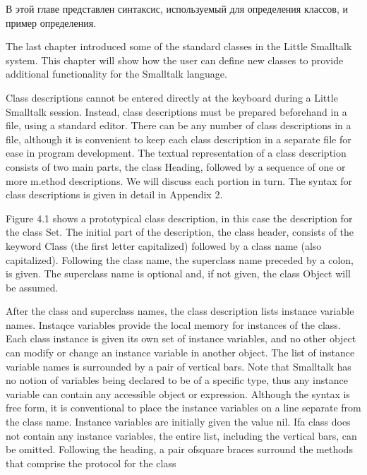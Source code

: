 \secdown

В этой главе представлен синтаксис, используемый для определения классов, и пример определения.

\bigskip

The last chapter introduced some of the standard classes in the Little
Smalltalk system. This chapter will show how the user can define new
classes to provide additional functionality for the Smalltalk language.

Class descriptions cannot be entered directly at the keyboard during
a Little Smalltalk session. Instead, class descriptions must be prepared
beforehand in a file, using a standard editor. There can be any number of
class descriptions in a file, although it is convenient to keep each class
description in a separate file for ease in program development. The textual
representation of a class description consists of two main parts, the class
Heading, followed by a sequence of one or more m.ethod descriptions. We
will discuss each portion in turn. The syntax for class descriptions is given
in detail in Appendix 2.

Figure 4.1 shows a prototypical class description, in this case the description for the class Set. The initial part of the description, the class
header, consists of the keyword Class (the first letter capitalized) followed
by a class name (also capitalized). Following the class name, the superclass
name preceded by a colon, is given. The superclass name is optional and,
if not given, the class Object will be assumed.

After the class and superclass names, the class description lists instance
variable names. Instaqce variables provide the local memory for instances
of the class. Each class instance is given its own set of instance variables,
and no other object can modify or change an instance variable in another
object. The list of instance variable names is surrounded by a pair of
vertical bars. Note that Smalltalk has no notion of variables being declared
to be of a specific type, thus any instance variable can contain any accessible
object or expression. Although the syntax is free form, it is conventional
to place the instance variables on a line separate from the class name.
Instance variables are initially given the value nil. Ifa class does not contain
any instance variables, the entire list, including the vertical bars, can be
omitted. Following the heading, a pair ofsquare braces surround the methods that comprise the protocol for the class

